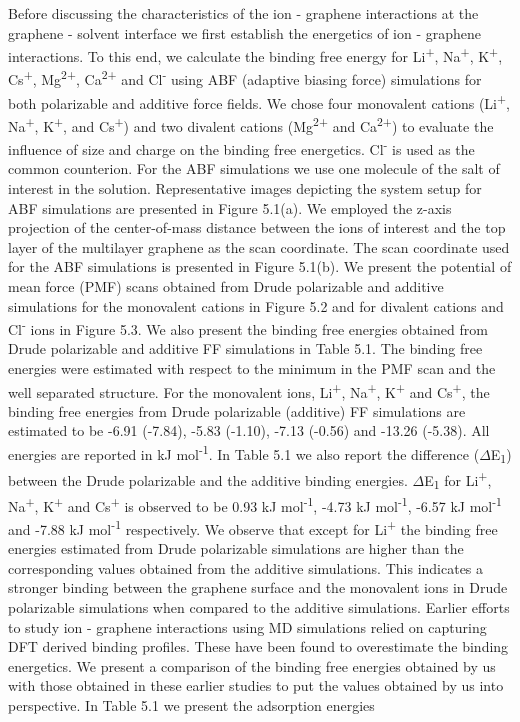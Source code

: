Before discussing the characteristics of the ion - graphene interactions at the graphene - solvent interface we first establish the energetics of ion - graphene interactions.  To this end, we calculate the binding free energy for Li\textsuperscript{+}, Na\textsuperscript{+}, K\textsuperscript{+}, Cs\textsuperscript{+}, Mg\textsuperscript{2+}, Ca\textsuperscript{2+} and Cl\textsuperscript{-} using ABF (adaptive biasing force) simulations for both polarizable and additive force fields. We chose four monovalent cations (Li\textsuperscript{+}, Na\textsuperscript{+}, K\textsuperscript{+}, and Cs\textsuperscript{+}) and two divalent cations (Mg\textsuperscript{2+} and Ca\textsuperscript{2+}) to evaluate the influence of size and charge on the binding free energetics. Cl\textsuperscript{-} is used as the common counterion.  For the ABF simulations we use one molecule of the salt of interest in the solution. Representative images depicting the system setup for ABF simulations are presented in Figure 5.1(a). We employed the z-axis projection of the center-of-mass distance between the ions of interest and the top layer of the multilayer graphene as the scan coordinate. The scan coordinate used for the ABF simulations is presented in Figure 5.1(b). We present the potential of mean force (PMF) scans obtained from Drude polarizable and additive simulations for the monovalent cations in Figure 5.2 and for divalent cations and Cl\textsuperscript{-} ions in Figure 5.3. We also present the binding free energies obtained from Drude polarizable and additive FF simulations in Table 5.1. The binding free energies were estimated with respect to the minimum in the PMF scan and the well separated structure. For the monovalent ions, Li\textsuperscript{+}, Na\textsuperscript{+}, K\textsuperscript{+} and Cs\textsuperscript{+}, the binding free energies from Drude polarizable (additive) FF simulations are estimated to be -6.91 (-7.84), -5.83 (-1.10), -7.13 (-0.56) and -13.26 (-5.38). All energies are reported in kJ mol\textsuperscript{-1}. In Table 5.1 we also report the difference ($\Delta$E\textsubscript{1}) between the Drude polarizable and the additive binding energies. $\Delta$E\textsubscript{1} for Li\textsuperscript{+}, Na\textsuperscript{+}, K\textsuperscript{+} and Cs\textsuperscript{+} is observed to be 0.93 kJ mol\textsuperscript{-1}, -4.73 kJ mol\textsuperscript{-1}, -6.57 kJ mol\textsuperscript{-1} and -7.88 kJ mol\textsuperscript{-1} respectively.  We observe that except for Li\textsuperscript{+} the binding free energies estimated from Drude polarizable simulations are higher than the corresponding values obtained from the additive simulations. This indicates a stronger binding between the graphene surface and the monovalent ions in Drude polarizable simulations when compared to the additive simulations.  Earlier efforts to study ion - graphene interactions using MD simulations relied on capturing DFT derived binding profiles.\supercite{williams_effective_2017,chen_multiscale_2018} These have been found to overestimate the binding energetics.\supercite{elliott_qmmd_2020} We present a comparison of the binding free energies obtained by us with those obtained in these earlier studies to put the values obtained by us into perspective.  In Table 5.1 we present the adsorption energies 
